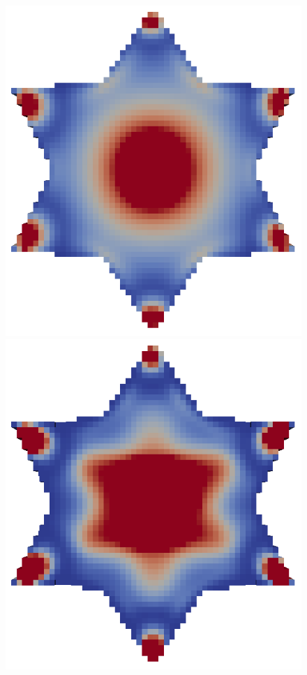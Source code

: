 \begin{frame}
\begin{minipage}{0.85\textwidth}
{\begin{figure}
			\includegraphics[scale=0.06]{Pictures/TopOp/Star_Optimized1_Trans.png}
			\includegraphics[scale=0.06]{Pictures/TopOp/Star_Optimized2_Trans.png}

\end{figure}}
\end{minipage}
\end{frame}
